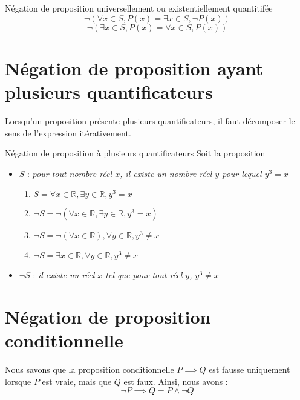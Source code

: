 \documentclass[16pt]{report}
\begin{document}
\begin{multicols*}{2}
            \begin{Theorem}{Négation de proposition universellement ou existentiellement quantitifée}{}
                \[ \neg (\forall x \in S, P(x) = \exists x \in S, \neg P(x))\]
                \[ \neg (\exists x \in S, P(x) = \forall x \in S, P(x)) \]
            \end{Theorem}

            \section{Négation de proposition ayant plusieurs quantificateurs}
            Lorsqu'un proposition présente plusieurs quantificateurs, il faut décomposer le sens de l'expression 
            itérativement. 
            
            \begin{EExample}{Négation de proposition à plusieurs quantificateurs}{}
                Soit la proposition 
                \begin{itemize}
                    \item $S$ : \textit{pour tout nombre réel $x$, il existe un nombre réel $y$ pour lequel $y^3 = x$} 
                        \begin{enumerate}
                            \item $ S = \forall x \in \mathbb{R}, \exists y \in \mathbb{R}, y^3 = x$ 
                            \item $ \neg S = \neg (\forall x \in \mathbb{R}, \exists y \in \mathbb{R}, y^3 = x)$
                            \item  $\neg S = \neg (\forall x \in \mathbb{R}), \forall y \in \mathbb{R}, y^3 \neq x$ 
                            \item  $\neg S = \exists x \in \mathbb{R}, \forall y \in \mathbb{R}, y^3 \neq x$
                        \end{enumerate}
                    \item $ \neg S$ : \textit{il existe un réel $x$ tel que pour tout réel $y$, $y^3 \neq x$}

                \end{itemize}
            \end{EExample}


            \section{Négation de proposition conditionnelle}
            Nous savons que la proposition conditionnelle $P \implies  Q$ est fausse uniquement lorsque $P$ est vraie, 
            mais que $Q$ est faux. Ainsi, nous avons : 
            \[ \neg P \implies  Q = P \land \neg Q \]


\end{multicols*}
\end{document}
